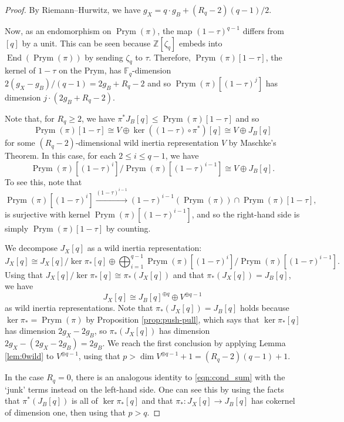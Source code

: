\documentclass[12pt]{amsart}
\theoremstyle{definition}
\theoremstyle{remark}
\newcommand{\ZZ}{\mathbb{Z}}
\newcommand{\FF}{\mathbb{F}}
\DeclareMathOperator{\End}{End}
\DeclareMathOperator{\Prym}{Prym}
\begin{document}
\begin{proof}
    By Riemann--Hurwitz, we have $g_X=q\cdot g_B + (R_q-2)(q-1)/2$.

    Now, as an endomorphism on $\Prym(\pi)$, the map $(1-\tau)^{q-1}$ differs from $[q]$ by a unit. This can be seen because $\ZZ[\zeta_q]$ embeds into $\End(\Prym(\pi))$ by sending $\zeta_q$ to $\tau$. Therefore, $\Prym(\pi)[1-\tau]$, the kernel of $1-\tau$ on the Prym, has $\FF_q$-dimension $2(g_X-g_B)/(q-1)=2g_B+R_q-2$ and so $\Prym(\pi)[(1-\tau)^{j}]$ has dimension $j \cdot (2g_B+R_q-2)$.

    Note that, for $R_q\ge2$, we have $\pi^*J_B[q]\le\Prym(\pi)[1-\tau]$ and so 
    \[\Prym(\pi)[1-\tau]\cong V\oplus \ker((1-\tau)\circ\pi^*)[q]\cong V\oplus J_B[q]\] 
    for some $(R_q-2)$-dimensional wild inertia representation $V$ by Maschke's Theorem. In this case, for each $2\le i\le q-1$, we have
    \[ \Prym(\pi)[(1-\tau)^i]/\Prym(\pi)[(1-\tau)^{i-1}] \cong V\oplus J_B[q].\]
    To see this, note that
    \[\Prym(\pi)[(1-\tau)^i]\xrightarrow{(1-\tau)^{i-1}} (1-\tau)^{i-1}(\Prym(\pi))\cap \Prym(\pi)[1-\tau],\]
    is surjective with kernel $\Prym(\pi)[(1-\tau)^{i-1}]$, and so the right-hand side is simply $\Prym(\pi)[1-\tau]$ by counting.

    We decompose $J_X[q]$ as a wild inertia representation:
    \begin{equation}
        J_X[q] \cong J_X[q]/\ker\pi_*[q] \oplus \bigoplus_{i=1}^{q-1} \Prym(\pi)[(1-\tau)^i]/\Prym(\pi)[(1-\tau)^{i-1}].
    \end{equation}
    Using that $J_X[q]/\ker\pi_*[q]\cong\pi_*(J_X[q])$ and that $\pi_*(J_X[q])=J_B[q]$, we have
    \begin{equation}\label{eqn:cond_sum}\tag{$\dagger$}
        J_X[q]\cong J_B[q]^{\oplus q}\oplus V^{\oplus q-1}
    \end{equation}
    as wild inertia representations. Note that $\pi_*(J_X[q])=J_B[q]$ holds because $\ker\pi_*=\Prym(\pi)$ by Proposition \ref{prop:push-pull}, which says that $\ker\pi_*[q]$ has dimension $2g_X-2g_B$, so $\pi_*(J_X[q])$ has dimension $2g_X - (2g_X-2g_B) = 2g_B$. We reach the first conclusion by applying Lemma \ref{lem:0wild} to $V^{\oplus q-1}$, using that $p>\dim V^{\oplus q-1} +1 = (R_q-2)(q-1)+1$. 

    In the case $R_q=0$, there is an analogous identity to \eqref{eqn:cond_sum} with the `junk' terms instead on the left-hand side. One can see this by using the facts that $\pi^*(J_B[q])$ is all of $\ker\pi_*[q]$ and that $\pi_*: J_X[q]\to J_B[q]$ has cokernel of dimension one, then using that $p>q$.


\end{proof}
\end{document}
